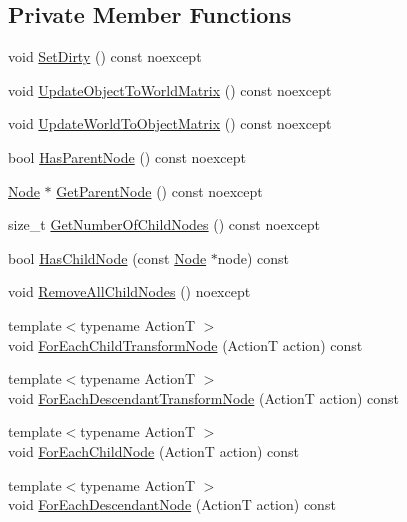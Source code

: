 \subsection*{Private Member Functions}
\begin{DoxyCompactItemize}
\item 
void \hyperlink{classmage_1_1_transform_node_aef6e402c69bb125b09925b7a5ca79b33}{Set\+Dirty} () const noexcept
\item 
void \hyperlink{classmage_1_1_transform_node_a2102425a193884bea453c783388f6a38}{Update\+Object\+To\+World\+Matrix} () const noexcept
\item 
void \hyperlink{classmage_1_1_transform_node_aec6309962398c128fdf3f50cbff13e89}{Update\+World\+To\+Object\+Matrix} () const noexcept
\item 
bool \hyperlink{classmage_1_1_transform_node_ad225b5c9f2236f8c6c91dd7a6a9c4ffd}{Has\+Parent\+Node} () const noexcept
\item 
\hyperlink{classmage_1_1_node}{Node} $\ast$ \hyperlink{classmage_1_1_transform_node_a63ed2249e0629f0874da5095c0deb705}{Get\+Parent\+Node} () const noexcept
\item 
size\+\_\+t \hyperlink{classmage_1_1_transform_node_a3efc0401cee8fc6215148963ce3e8227}{Get\+Number\+Of\+Child\+Nodes} () const noexcept
\item 
bool \hyperlink{classmage_1_1_transform_node_ab56e299f356ba599d468600ad2948120}{Has\+Child\+Node} (const \hyperlink{classmage_1_1_node}{Node} $\ast$node) const
\item 
void \hyperlink{classmage_1_1_transform_node_aae7e3f918bcf38bd16db8475c7797c0b}{Remove\+All\+Child\+Nodes} () noexcept
\item 
{\footnotesize template$<$typename ActionT $>$ }\\void \hyperlink{classmage_1_1_transform_node_ad9c166b58e3718125d2a51827f8d7ca2}{For\+Each\+Child\+Transform\+Node} (ActionT action) const
\item 
{\footnotesize template$<$typename ActionT $>$ }\\void \hyperlink{classmage_1_1_transform_node_a7a052715d9591defa06e494017539711}{For\+Each\+Descendant\+Transform\+Node} (ActionT action) const
\item 
{\footnotesize template$<$typename ActionT $>$ }\\void \hyperlink{classmage_1_1_transform_node_a3dd36b373d27e3526df562ba899f721f}{For\+Each\+Child\+Node} (ActionT action) const
\item 
{\footnotesize template$<$typename ActionT $>$ }\\void \hyperlink{classmage_1_1_transform_node_a696d23bd936d3c3f880cb8b5cfd54d80}{For\+Each\+Descendant\+Node} (ActionT action) const
\end{DoxyCompactItemize}
